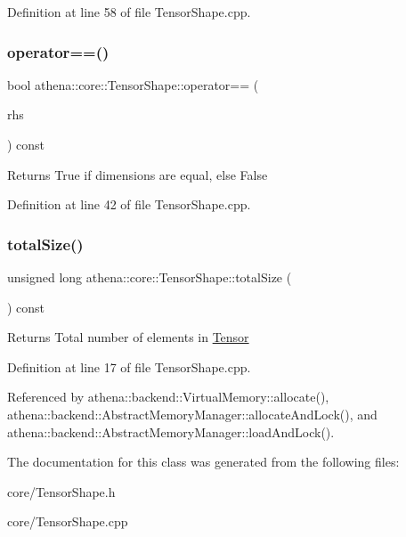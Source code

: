 Definition at line 58 of file Tensor\+Shape.\+cpp.

\mbox{\label{classathena_1_1core_1_1_tensor_shape_aa42737e3e51e76507bb60791889d4d9b}} 
\subsubsection{\texorpdfstring{operator==()}{operator==()}}
{\footnotesize\ttfamily bool athena\+::core\+::\+Tensor\+Shape\+::operator== (\begin{DoxyParamCaption}\item[{const \mbox{\hyperlink{classathena_1_1core_1_1_tensor_shape}{Tensor\+Shape}} \&}]{rhs }\end{DoxyParamCaption}) const}

\begin{DoxyReturn}{Returns}
True if dimensions are equal, else False 
\end{DoxyReturn}


Definition at line 42 of file Tensor\+Shape.\+cpp.

\mbox{\label{classathena_1_1core_1_1_tensor_shape_a81219fb0b0e3e6852cb02fbbcf059882}} 
\subsubsection{\texorpdfstring{total\+Size()}{totalSize()}}
{\footnotesize\ttfamily unsigned long athena\+::core\+::\+Tensor\+Shape\+::total\+Size (\begin{DoxyParamCaption}{ }\end{DoxyParamCaption}) const}

\begin{DoxyReturn}{Returns}
Total number of elements in \mbox{\hyperlink{classathena_1_1core_1_1_tensor}{Tensor}} 
\end{DoxyReturn}


Definition at line 17 of file Tensor\+Shape.\+cpp.



Referenced by athena\+::backend\+::\+Virtual\+Memory\+::allocate(), athena\+::backend\+::\+Abstract\+Memory\+Manager\+::allocate\+And\+Lock(), and athena\+::backend\+::\+Abstract\+Memory\+Manager\+::load\+And\+Lock().



The documentation for this class was generated from the following files\+:\begin{DoxyCompactItemize}
\item 
core/Tensor\+Shape.\+h\item 
core/Tensor\+Shape.\+cpp\end{DoxyCompactItemize}
